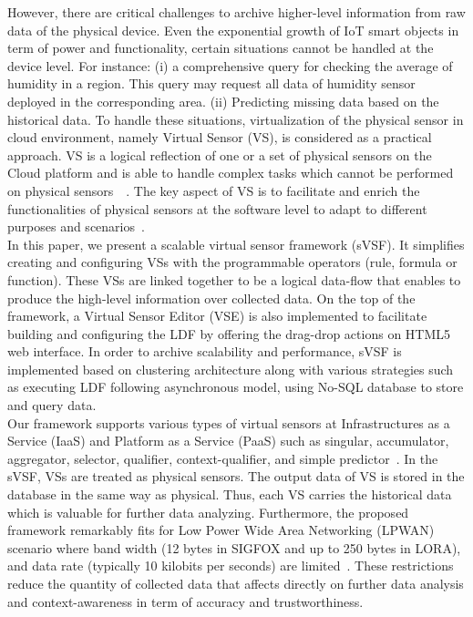 However, there are critical challenges to archive higher-level information from raw data of the physical device. Even the exponential growth of IoT smart objects in term of power and functionality, certain situations cannot be handled at the device level. For instance: (i) a comprehensive query for checking the average of humidity in a region. This query may request all data of humidity sensor deployed in the corresponding area. (ii) Predicting missing data based on the historical data. To handle these situations, virtualization of the physical sensor in cloud environment, namely Virtual Sensor (VS), is considered as a practical approach. VS is a logical reflection of one or a set of physical sensors on the Cloud platform and is able to handle complex tasks which cannot be performed on physical sensors~\cite{Julien2006}~\cite{Crowcroft2012}. The key aspect of VS is to facilitate and enrich the functionalities of physical sensors at the software level to adapt to different purposes and scenarios~\cite{GuptaMukherjee2016}. \\

In this paper, we present a scalable virtual sensor framework (sVSF). It simplifies creating and configuring VSs with the programmable operators (rule, formula or function). These VSs are linked together to be a logical data-flow that enables to produce the high-level information over collected data. On the top of the framework, a Virtual Sensor Editor (VSE) is also implemented to facilitate building and configuring the LDF by offering the drag-drop actions on HTML5 web interface. In order to archive scalability and performance, sVSF is implemented based on clustering architecture along with various strategies such as executing LDF following asynchronous model, using No-SQL database to store and query data. \\

Our framework supports various types of virtual sensors at Infrastructures as a Service (IaaS) and Platform as a Service (PaaS) such as singular, accumulator, aggregator, selector, qualifier, context-qualifier, and simple predictor~\cite{SBoseAGuptaSAdhikaryN2015}. In the sVSF, VSs are treated as physical sensors. The output data of VS is stored in the database in the same way as physical. Thus, each VS carries the historical data which is valuable for further data analyzing. Furthermore, the proposed framework remarkably fits for Low Power Wide Area Networking (LPWAN) scenario where band width (12 bytes in SIGFOX and up to 250 bytes in LORA), and data rate (typically 10 kilobits per seconds) are limited~\cite{AdelantadoVilajosanaTusetMartinezMeliaSegui2017}. These restrictions reduce the quantity of collected data that affects directly on further data analysis and context-awareness in term of accuracy and trustworthiness. \\


